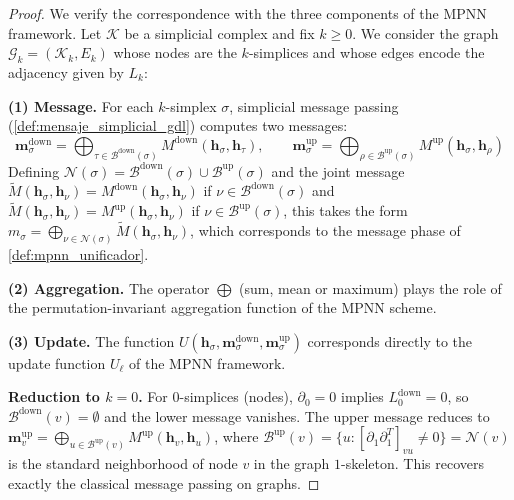 \begin{proof}
We verify the correspondence with the three components of the \gls{MPNN} framework. Let $\mathcal{K}$ be a simplicial complex and fix $k \geq 0$. We consider the graph $\mathcal{G}_k = (\mathcal{K}_k, E_k)$ whose nodes are the $k$-simplices and whose edges encode the adjacency given by $L_k$:

\textbf{(1) Message.} For each $k$-simplex $\sigma$, simplicial message passing (\autoref{def:mensaje_simplicial_gdl}) computes two messages:
\[
\mathbf{m}_\sigma^{\mathrm{down}} = \bigoplus_{\tau \in \mathcal{B}^{\mathrm{down}}(\sigma)} M^{\mathrm{down}}(\mathbf{h}_\sigma, \mathbf{h}_\tau), \qquad
\mathbf{m}_\sigma^{\mathrm{up}} = \bigoplus_{\rho \in \mathcal{B}^{\mathrm{up}}(\sigma)} M^{\mathrm{up}}(\mathbf{h}_\sigma, \mathbf{h}_\rho)
\]
Defining $\mathcal{N}(\sigma) = \mathcal{B}^{\mathrm{down}}(\sigma) \cup \mathcal{B}^{\mathrm{up}}(\sigma)$ and the joint message $\widetilde{M}(\mathbf{h}_\sigma, \mathbf{h}_\nu) = M^{\mathrm{down}}(\mathbf{h}_\sigma, \mathbf{h}_\nu)$ if $\nu \in \mathcal{B}^{\mathrm{down}}(\sigma)$ and $\widetilde{M}(\mathbf{h}_\sigma, \mathbf{h}_\nu) = M^{\mathrm{up}}(\mathbf{h}_\sigma, \mathbf{h}_\nu)$ if $\nu \in \mathcal{B}^{\mathrm{up}}(\sigma)$, this takes the form $m_\sigma = \bigoplus_{\nu \in \mathcal{N}(\sigma)} \widetilde{M}(\mathbf{h}_\sigma, \mathbf{h}_\nu)$, which corresponds to the message phase of \autoref{def:mpnn_unificador}.

\textbf{(2) Aggregation.} The operator $\bigoplus$ (sum, mean or maximum) plays the role of the permutation-invariant aggregation function of the \gls{MPNN} scheme.

\textbf{(3) Update.} The function $U(\mathbf{h}_\sigma, \mathbf{m}_\sigma^{\mathrm{down}}, \mathbf{m}_\sigma^{\mathrm{up}})$ corresponds directly to the update function $U_\ell$ of the \gls{MPNN} framework.

\textbf{Reduction to $k=0$.} For $0$-simplices (nodes), $\partial_0 = 0$ implies $L_0^{\mathrm{down}} = 0$, so $\mathcal{B}^{\mathrm{down}}(v) = \emptyset$ and the lower message vanishes. The upper message reduces to $\mathbf{m}_v^{\mathrm{up}} = \bigoplus_{u \in \mathcal{B}^{\mathrm{up}}(v)} M^{\mathrm{up}}(\mathbf{h}_v, \mathbf{h}_u)$, where $\mathcal{B}^{\mathrm{up}}(v) = \{u : [\partial_1 \partial_1^T]_{vu} \neq 0\} = \mathcal{N}(v)$ is the standard neighborhood of node $v$ in the graph $1$-skeleton. This recovers exactly the classical message passing on graphs.
\end{proof}

